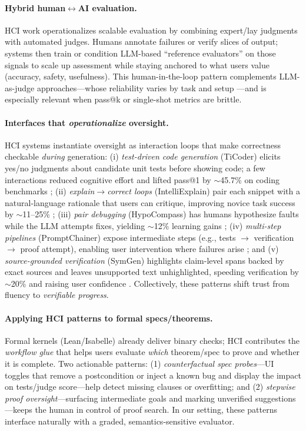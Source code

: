 \documentclass{article}
\begin{document}
\paragraph{Hybrid human$\leftrightarrow$AI evaluation.}
HCI work operationalizes scalable evaluation by combining expert/lay judgments with automated judges. Humans annotate failures or verify slices of output; systems then train or condition LLM-based ``reference evaluators'' on those signals to scale up assessment while staying anchored to what users value (accuracy, safety, usefulness). This human-in-the-loop pattern complements LLM-as-judge approaches---whose reliability varies by task and setup \citep{Kocmi2024HumanVsLLM,Li2024TrustLLMJudgments}---and is especially relevant when pass@k or single-shot metrics are brittle.

\paragraph{Interfaces that \emph{operationalize} oversight.}
HCI systems instantiate oversight as interaction loops that make correctness checkable \emph{during} generation: (i) \emph{test-driven code generation} (TiCoder) elicits yes/no judgments about candidate unit tests before showing code; a few interactions reduced cognitive effort and lifted pass@1 by $\sim$45.7\% on coding benchmarks \citep{naik2024ticoder}; (ii) \emph{explain$\rightarrow$correct loops} (IntelliExplain) pair each snippet with a natural-language rationale that users can critique, improving novice task success by $\sim$11--25\% \citep{yan2024intelliexplain}; (iii) \emph{pair debugging} (HypoCompass) has humans hypothesize faults while the LLM attempts fixes, yielding $\sim$12\% learning gains \citep{ma2024hypocompass}; (iv) \emph{multi-step pipelines} (PromptChainer) expose intermediate steps (e.g., tests $\rightarrow$ verification $\rightarrow$ proof attempt), enabling user intervention where failures arise \citep{wu2022promptchainer}; and (v) \emph{source-grounded verification} (SymGen) highlights claim-level spans backed by exact sources and leaves unsupported text unhighlighted, speeding verification by $\sim$20\% and raising user confidence \citep{shen2024symgen}. Collectively, these patterns shift trust from fluency to \emph{verifiable progress}.

\paragraph{Applying HCI patterns to formal specs/theorems.}
Formal kernels (Lean/Isabelle) already deliver binary checks; HCI contributes the \emph{workflow glue} that helps users evaluate \emph{which} theorem/spec to prove and whether it is complete. Two actionable patterns: (1) \emph{counterfactual spec probes}---UI toggles that remove a postcondition or inject a known bug and display the impact on tests/judge score---help detect missing clauses or overfitting; and (2) \emph{stepwise proof oversight}---surfacing intermediate goals and marking unverified suggestions---keeps the human in control of proof search. In our setting, these patterns interface naturally with a graded, semantics-sensitive evaluator.
\end{document}
